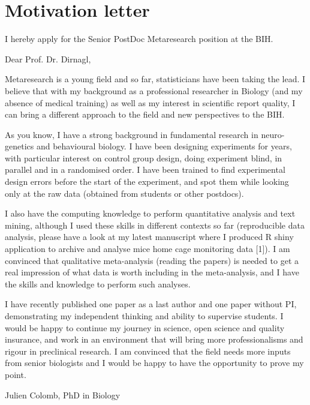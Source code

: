 \section* {Motivation letter}

I hereby apply for the Senior PostDoc Metaresearch position at the BIH.

\vspace {0.5cm} 

Dear Prof. Dr. Dirnagl,

Metaresearch is a young field and so far, statisticians have been taking the lead. I believe that with my background as a professional researcher in Biology (and my absence of medical training) as well as my interest in scientific report quality, I can bring a different approach to the field and new perspectives to the BIH. 

As you know, I have a strong background in fundamental research in neuro-genetics and behavioural biology. I have been designing experiments for years, with particular interest on control group design, doing experiment blind, in parallel and in a randomised order. I have been trained to find experimental design errors before the start of the experiment, and spot them while looking only at the raw data (obtained from students or other postdocs).

 I also have the computing knowledge to perform quantitative analysis and text mining, although I used these skills in different contexts so far (reproducible data analysis, please have a look at my latest manuscript where I produced R shiny application to archive and analyse mice home cage monitoring data [1]). I am convinced that qualitative meta-analysis (reading the papers) is needed to get a real impression of what data is worth including in the meta-analysis, and I have the skills and knowledge to perform such analyses.
 
I have recently published one paper as a last author and one paper without PI, demonstrating my independent thinking and ability to supervise students. 
I would be happy to continue my journey in science, open science and quality insurance, and work in an environment that will bring more professionalisms and rigour in preclinical research. I am convinced that the field needs more inputs from senior biologists and I would be happy to have the opportunity to prove my point.


Julien Colomb, PhD in Biology



